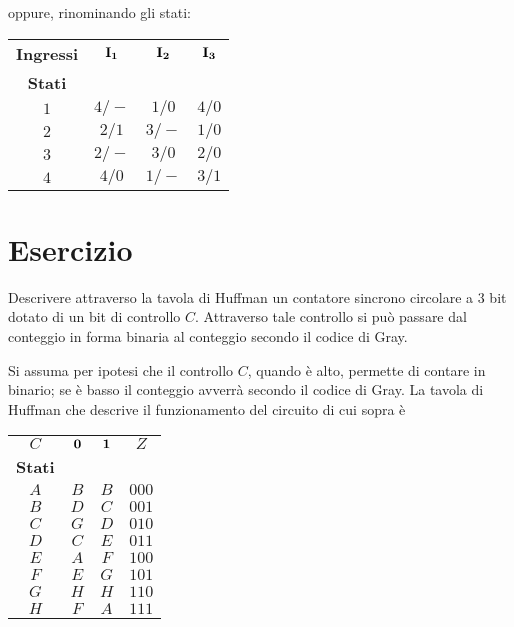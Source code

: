\documentclass[a4paper]{extarticle}
\renewcommand\arraystretch{}
\begin{document}
\vspace{1em}
\noindent
oppure, rinominando gli stati:

\vspace{1em}
\noindent
\begin{table}[H]
\setlength{\tabcolsep}{4pt}
\renewcommand{\arraystretch}{1.2}
\centering
\begin{tabular}{c|c|c|c}
    \textbf{Ingressi} & $\bf{I_1}$ & $\bf{I_2}$ & $\bf{I_3}$\\
    \textbf{Stati}    &            &            &\\
    \hline
    $1$  & $4/-$ & $1/0$ & $4/0$\\
    $2$  & $2/1$ & $3/-$ & $1/0$\\
    $3$  & $2/-$ & $3/0$ & $2/0$\\
    $4$  & $4/0$ & $1/-$ & $3/1$\\
\end{tabular}
\end{table}

\noindent
\section{Esercizio}
Descrivere attraverso la tavola di Huffman un contatore sincrono circolare a $3$ bit dotato di un bit di controllo $C$. Attraverso tale controllo si può passare dal conteggio in forma binaria al conteggio secondo il codice di Gray.

\vspace{2em}
\noindent
Si assuma per ipotesi che il controllo $C$, quando è alto, permette di contare in binario; se è basso il conteggio avverrà secondo il codice di Gray. La tavola di Huffman che descrive il funzionamento del circuito di cui sopra è

\vspace{1em}
\noindent
\begin{table}[H]
\setlength{\tabcolsep}{4pt}
\renewcommand{\arraystretch}{1.2}
\centering
\begin{tabular}{c|c|c|c}
    $C$ & $\bf{0}$ & $\bf{1}$ & $Z$\\
    \textbf{Stati} &    &     &\\
    \hline
    $A$  & $B$ & $B$ & $000$\\
    $B$  & $D$ & $C$ & $001$\\
    $C$  & $G$ & $D$ & $010$\\
    $D$  & $C$ & $E$ & $011$\\
    $E$  & $A$ & $F$ & $100$\\
    $F$  & $E$ & $G$ & $101$\\
    $G$  & $H$ & $H$ & $110$\\
    $H$  & $F$ & $A$ & $111$\\
\end{tabular}
\end{table}
\end{document}
